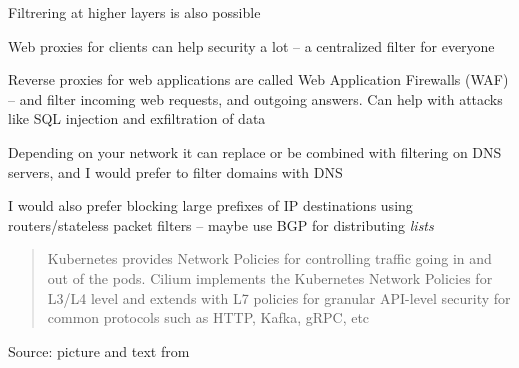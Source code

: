 \documentclass[Screen16to9,17pt]{foils}
\begin{document}
\begin{list2}
\item Filtrering at higher layers is also possible
\item Web proxies for clients can help security a lot -- a centralized filter for everyone

\item Reverse proxies for web applications are called
Web Application Firewalls (WAF) -- and filter incoming web requests, and outgoing answers. Can help with attacks like SQL injection and exfiltration of data
\item Depending on your network it can replace or be combined with filtering on DNS servers, and I would prefer to filter domains with DNS
\item I would also prefer blocking large prefixes of IP destinations using routers/stateless packet filters -- maybe use BGP for distributing \emph{lists}
\end{list2}




\begin{quote}
Kubernetes provides Network Policies for controlling traffic going in and out of the pods. Cilium implements the Kubernetes Network Policies for L3/L4 level and extends with L7 policies for granular API-level security for common protocols such as HTTP, Kafka, gRPC, etc
\end{quote}
Source: picture and text from 






\begin{quote}

\end{quote}

\begin{list2}
    \item
\end{list2}

\end{document}
